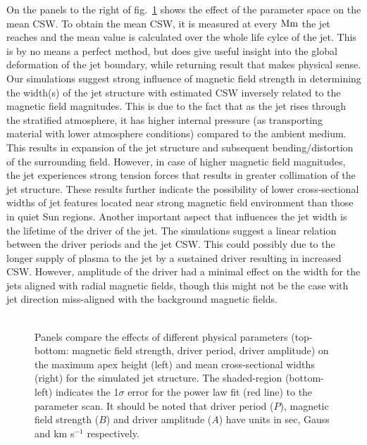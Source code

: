 \documentclass[12pt]{ociamthesis}
\newcommand{\np}{\\ \\}
\begin{document}
On the panels to the right of fig.~\ref{parameter_scan_lines} shows the effect of the parameter space on the mean CSW. To obtain the mean CSW, it is measured at every $\rm{Mm}$ the jet reaches and the mean value is calculated over the whole life cylce of the jet. This is by no means a perfect method, but does give useful insight into the global deformation of the jet boundary, while returning result that makes physical sense. Our simulations suggest strong influence of magnetic field strength in determining the width(s) of the jet structure with estimated CSW inversely related to the magnetic field magnitudes. This is due to the fact that as the jet rises through the stratified atmosphere, it has higher internal pressure (as transporting material with lower atmosphere conditions) compared to the ambient medium. This results in expansion of the jet structure and subsequent bending/distortion of the surrounding field. However, in case of higher magnetic field magnitudes, the jet experiences strong tension forces that results in greater collimation of the jet structure. These results further indicate the possibility of lower cross-sectional widths of jet features located near strong magnetic field environment than those in quiet Sun regions. Another important aspect that influences the jet width is the lifetime of the driver of the jet. The simulations suggest a linear relation between the driver periods and the jet CSW. This could possibly due to the longer supply of plasma to the jet by a sustained driver resulting in increased CSW. However, amplitude of the driver had a minimal effect on the width for the jets aligned with radial magnetic fields, though this might not be the case with jet direction miss-aligned with the background magnetic fields. \np
\begin{figure}
\captionsetup[subfigure]{labelformat=empty}
\centering
{} 
\caption{Panels compare the effects of different physical parameters (top-bottom: magnetic field strength, driver period, driver amplitude) on the maximum apex height (left) and mean cross-sectional widths (right) for the simulated jet structure. The shaded-region (bottom-left) indicates the 1$\sigma$ error for the power law fit (red line) to the parameter scan. It should be noted that driver period ($P$), magnetic field strength ($B$) and driver amplitude ($A$) have units in sec, Gauss and km s$^{-1}$ respectively.}
\label{parameter_scan_lines}
\end{figure}
\end{document}
